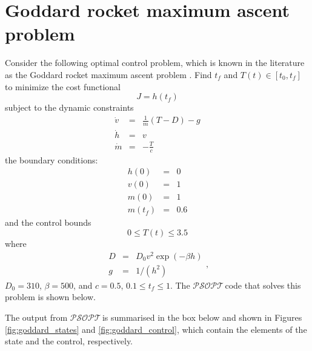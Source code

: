 \documentclass[a4paper,11pt]{report}    %
\newcommand{\psopt}{$\mathcal{PSOPT}$\,}  %
\newenvironment{shadedframe}{%
  \def\FrameCommand{\fcolorbox{black}{shadecolor}}%
  \MakeFramed {\FrameRestore}}
{\endMakeFramed}
\begin{document}
\section{Goddard rocket maximum ascent problem}

Consider the following optimal control problem, which is known in the literature
as the Goddard rocket maximum ascent problem \cite{Bryson:99}.  Find $t_f$ and $T(t) \in [t_0, t_f]$ 
to minimize the cost functional
\begin{equation}
  J = h(t_f)
\end{equation}
subject to the dynamic constraints
\begin{equation}
  \begin{array}{lcl}
   \dot v &=& \frac{1}{m}(T-D)-g \\
   \dot h &=& v \\
   \dot m &=& -\frac{T}{c}
  \end{array}
\end{equation}
the boundary conditions:
 \begin{equation}
  \begin{array}{lcl}
   h(0) &=& 0 \\
   v(0) &=& 1 \\
   m(0) &=& 1 \\
   m(t_f) &=& 0.6 
  \end{array}
\end{equation}
and the control bounds
\begin{equation}
  0 \le T(t) \le 3.5
\end{equation}
where
\begin{equation}
  \begin{array}{lcl}
   D &=& D_0 v^2\exp(-\beta h) \\
   g &=& 1/(h^2)
  \end{array},
\end{equation}
$D_0=310$, $\beta=500$, and $c = 0.5$, $0.1 \le t_f \le 1$. The
\psopt code that solves this problem is shown below.  

\tiny
\begin{shadedframe}

\end{shadedframe}
\normalsize

The output from \psopt is summarised in the box below and  shown in Figures \ref{fig:goddard_states} and \ref{fig:goddard_control}, which contain the elements
of the state and the control, respectively.

\begin{shadedframe}

\end{shadedframe}
\end{document}
